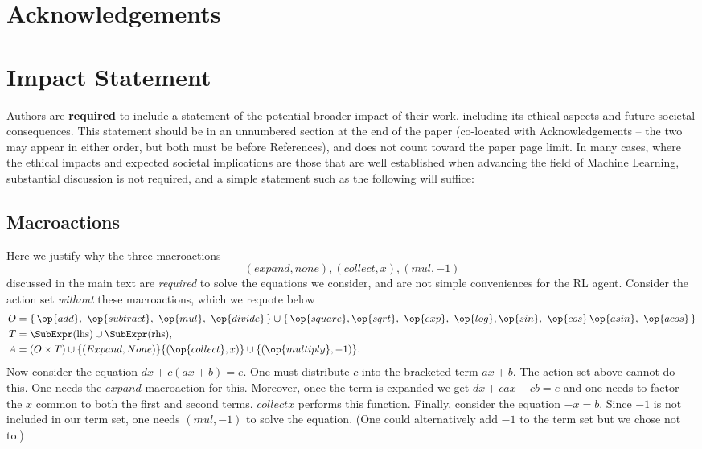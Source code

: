 \documentclass{article}
\theoremstyle{plain}
\theoremstyle{definition}
\theoremstyle{remark}
\begin{document}
\section*{Acknowledgements}


\section*{Impact Statement}

Authors are \textbf{required} to include a statement of the potential 
broader impact of their work, including its ethical aspects and future 
societal consequences. This statement should be in an unnumbered 
section at the end of the paper (co-located with Acknowledgements -- 
the two may appear in either order, but both must be before References), 
and does not count toward the paper page limit. In many cases, where 
the ethical impacts and expected societal implications are those that 
are well established when advancing the field of Machine Learning, 
substantial discussion is not required, and a simple statement such 
as the following will suffice:

\nocite{langley00}




\newpage
\appendix
\onecolumn


\subsection{Macroactions}
Here we justify why the three macroactions $$(expand, none), (collect, x), (mul,-1)$$ discussed in the main text are \textit{required} to solve the equations we consider, and are not simple conveniences for the RL agent. Consider the action set \textit{without} these macroactions, which we requote below
\begin{align}
O &= \{\,\op{add},\ \op{subtract},\ \op{mul},\ \op{divide}\,\} \cup  \{\, \op{square}, \op{sqrt},\ \op{exp},\ \op{log}, \op{sin},\ \op{cos}\, \op{asin},\ \op{acos}\,\} \\
T   &= \SubExpr(\text{lhs}) \cup \SubExpr(\text{rhs}), \\
A   &= (O \times T) \cup \{(Expand, None)\} \{(\op{collect}, x)\} \cup \{(\op{multiply}, -1)\}.
\end{align}
Now consider the equation $dx + c(ax+b) = e$. One must distribute $c$ into the bracketed term $ax+b$. The action set above cannot do this. One needs the $expand$ macroaction for this. Moreover, once the term is expanded we get $dx+cax+cb = e$ and one needs to factor the $x$ common to both the first and second terms. $collect x$ performs this function. Finally, consider the equation $-x = b$. Since $-1$ is not included in our term set, one needs $(mul,-1)$ to solve the equation. (One could alternatively add $-1$ to the term set but we chose not to.)
\end{document}
